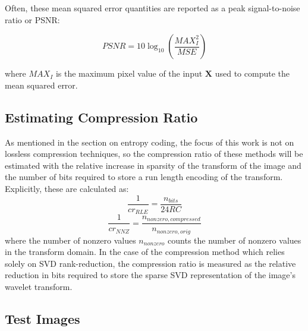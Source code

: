 \documentclass[conference]{IEEEtran}
\begin{document}
Often, these mean squared error quantities are reported as a peak signal-to-noise ratio or PSNR:

\begin{equation}
    PSNR = 10\log_{10}\left(\frac{MAX_I^2}{MSE}\right)
\end{equation}

where $MAX_I$ is the maximum pixel value of the input $\mathbf{X}$ used to compute the mean squared error.

\subsection{Estimating Compression Ratio}

As mentioned in the section on entropy coding, the focus of this work is not on lossless compression techniques, so the compression ratio of these methods will be estimated with the relative increase in sparsity of the transform of the image and the number of bits required to store a run length encoding of the transform.
Explicitly, these are calculated as:
\begin{equation}
    \frac{1}{cr_{RLE}} = \frac{n_{bits}}{24RC}
\end{equation}
\begin{equation}
    \frac{1}{cr_{NNZ}} = \frac{n_{nonzero,compressed}}{n_{nonzero,orig}}
\end{equation}
where the number of nonzero values $n_{nonzero}$ counts the number of nonzero values in the transform domain.
In the case of the compression method which relies solely on SVD rank-reduction, the compression ratio is measured as the relative reduction in bits required to store the sparse SVD representation of the image's wavelet transform.

\subsection{Test Images}
\end{document}
